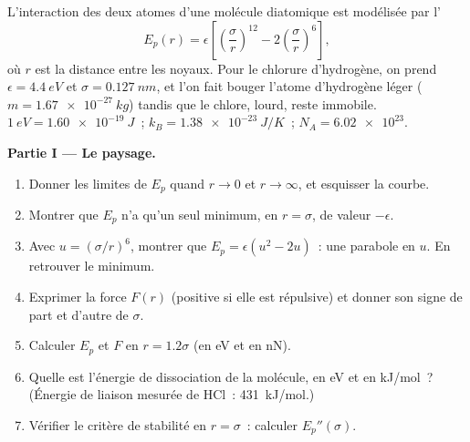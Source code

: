 \begin{problem}
\label{pb:b1:work-and-energy:1}
L'interaction des deux atomes d'une molécule diatomique est modélisée
par l'
\[
E_p(r) = \epsilon\left[\left(\frac{\sigma}{r}\right)^{12} - 2\left(\frac{\sigma}{r}\right)^{6}\right],
\]
où $r$ est la distance entre les noyaux. Pour le chlorure d'hydrogène,
on prend $\epsilon = \qty{4.4}{eV}$ et $\sigma = \qty{0.127}{nm}$, et
l'on fait bouger l'atome d'hydrogène léger ($m = \qty{1.67e-27}{kg}$)
tandis que le chlore, lourd, reste immobile.
$\qty{1}{eV} = \qty{1.60e-19}{J}$~; $k_B = \qty{1.38e-23}{J/K}$~;
$N_A = \num{6.02e23}$.

\medskip
\noindent\textbf{Partie I --- Le paysage.}
\begin{enumerate}
  \item Donner les limites de $E_p$ quand $r \to 0$ et $r \to \infty$, et
        esquisser la courbe.
  \item Montrer que $E_p$ n'a qu'un seul minimum, en $r = \sigma$, de
        valeur $-\epsilon$.
  \item Avec $u = (\sigma/r)^6$, montrer que $E_p = \epsilon(u^2 - 2u)$~:
        une parabole en $u$. En retrouver le minimum.
  \item Exprimer la force $F(r)$ (positive si elle est répulsive) et
        donner son signe de part et d'autre de $\sigma$.
  \item Calculer $E_p$ et $F$ en $r = 1.2\sigma$ (en eV et en nN).
  \item Quelle est l'énergie de dissociation de la molécule, en eV et en
        \unit{kJ/mol}~? (Énergie de liaison mesurée de HCl~: \qty{431}{kJ/mol}.)
  \item Vérifier le critère de stabilité en $r = \sigma$~: calculer
        $E_p''(\sigma)$.
\end{enumerate}


\end{problem}
